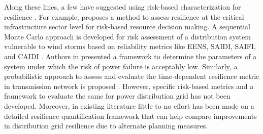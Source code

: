 \documentclass[12pt]{article}
\begin{document}


Along these lines, a few have suggested using risk-based characterization for resilience \cite{arghandeh2016definition}. For example, \cite{carlson2012resilience} proposes a method to assess resilience at the critical infrastructure sector level for risk-based resource decision making. A sequential Monte Carlo approach is developed for risk assessment of a distribution system vulnerable to wind storms based on reliability metrics like EENS, SAIDI, SAIFI, and CAIDI \cite{li2014risk}. Authors in  \cite{cassidy2016risk} presented a framework to determine the parameters of a system under which the risk of power failure is acceptably low. Similarly, a probabilistic approach to assess and evaluate the time-dependent resilience metric in transmission network is proposed \cite{panteli2017metrics}. However, specific risk-based metrics and a framework to evaluate the same for power distribution grid has not been developed. Moreover, in existing literature little to no effort has been made on a detailed resilience quantification framework that can help compare improvements in distribution grid resilience due to alternate planning measures. 
\end{document}
